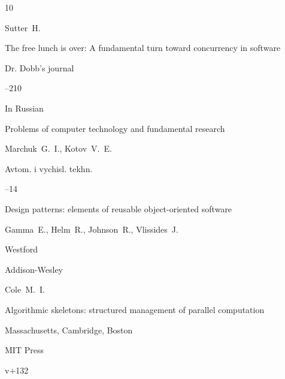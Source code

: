 \begin{thebibliography}{10}






\by Sutter~H.

\paper The free lunch is over: A fundamental turn toward   concurrency in software

\jour Dr. Dobb’s journal




--210





\lang In Russian

\paper  Problems of computer technology and fundamental research

\by Marchuk~G.~I., Kotov~V.~E.

\jour Avtom. i vychisl. tekhn.



--14




\book Design patterns: elements of reusable object-oriented software

\by Gamma~E., Helm~R., Johnson~R., Vlissides~J.

\publaddr Westford

\publ Addison-Wesley






\by Cole~M.~I.

\book Algorithmic skeletons: structured management of parallel   computation

\publaddr Massachu\-setts, Cambridge, Boston

\publ MIT Press


\totalpages v+132









\end{thebibliography}
